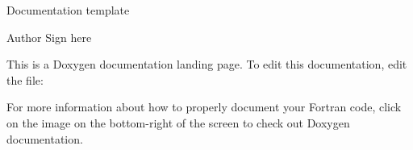 Documentation template \begin{DoxyAuthor}{Author}
Sign here
\end{DoxyAuthor}
This is a Doxygen documentation landing page. To edit this documentation, edit the file\+: 
\begin{DoxyCode}{0}

\end{DoxyCode}


For more information about how to properly document your Fortran code, click on the image on the bottom-\/right of the screen to check out Doxygen documentation. 